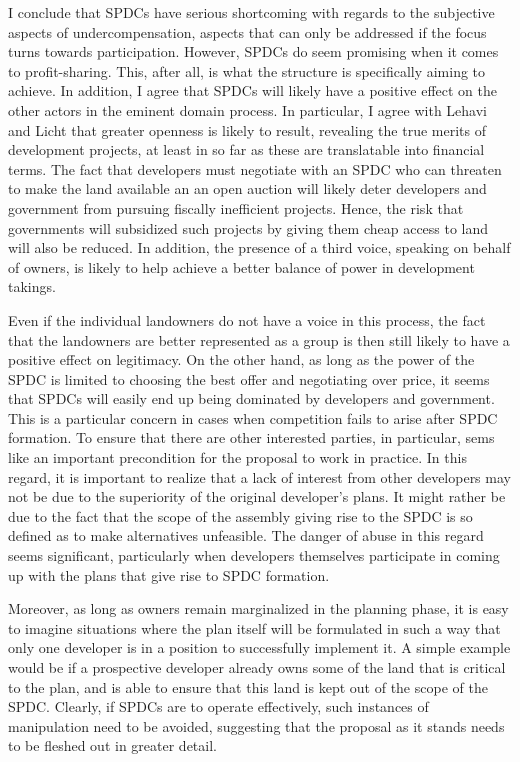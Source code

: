 I conclude that SPDCs have serious shortcoming with regards to the subjective aspects of undercompensation, aspects that can only be addressed if the focus turns towards participation. However, SPDCs do seem promising when it comes to profit-sharing. This, after all, is what the structure is specifically aiming to achieve. In addition, I agree that SPDCs will likely have a positive effect on the other actors in the eminent domain process. In particular, I agree with Lehavi and Licht that greater openness is likely to result, revealing the true merits of development projects, at least in so far as these are translatable into financial terms. The fact that developers must negotiate with an SPDC who can threaten to make the land available an an open auction will likely deter developers and government from pursuing fiscally inefficient projects. Hence, the risk that governments will subsidized such projects by giving them cheap access to land will also be reduced. In addition, the presence of a third voice, speaking on behalf of owners, is likely to help achieve a better balance of power in development takings. 

Even if the individual landowners do not have a voice in this process, the fact that the landowners are better represented as a group is then still likely to have a positive effect on legitimacy. On the other hand, as long as the power of the SPDC is limited to choosing the best offer and negotiating over price, it seems that SPDCs will easily end up being dominated by developers and government. This is a particular concern in cases when competition fails to arise after SPDC formation. To ensure that there are other interested parties, in particular, sems like an important precondition for the proposal to work in practice. In this regard, it is important to realize that a lack of interest from other developers may not be due to the superiority of the original developer's plans. It might rather be due to the fact that the scope of the assembly giving rise to the SPDC is so defined as to make alternatives unfeasible. The danger of abuse in this regard seems significant, particularly when developers themselves participate in coming up with the plans that give rise to SPDC formation. 

Moreover, as long as owners remain marginalized in the planning phase, it is easy to imagine situations where the plan itself will be formulated in such a way that only one developer is in a position to successfully implement it. A simple example would be if a prospective developer already owns some of the land that is critical to the plan, and is able to ensure that this land is kept out of the scope of the SPDC. Clearly, if SPDCs are to operate effectively, such instances of manipulation need to be avoided, suggesting that the proposal as it stands needs to be fleshed out in greater detail.

